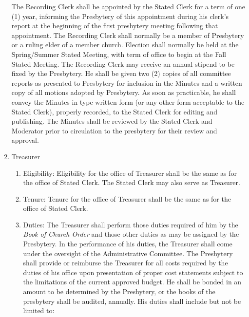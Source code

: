 \documentclass[
]{book}
\providecommand{\tightlist}{%
  \setlength{\itemsep}{0pt}\setlength{\parskip}{0pt}}
\begin{document}
\begin{enumerate}
  The Recording Clerk shall be appointed by the Stated Clerk for a term of one (1) year, informing the Presbytery of this appointment during his clerk's report at the beginning of the first presbytery meeting following that appointment. The Recording Clerk shall normally be a member of Presbytery or a ruling elder of a member church. Election shall normally be held at the Spring/Summer Stated Meeting, with term of office to begin at the Fall Stated Meeting. The Recording Clerk may receive an annual stipend to be fixed by the Presbytery. He shall be given two (2) copies of all committee reports as presented to Presbytery for inclusion in the Minutes and a written copy of all motions adopted by Presbytery. As soon as practicable, he shall convey the Minutes in type-written form (or any other form acceptable to the Stated Clerk), properly recorded, to the Stated Clerk for editing and publishing. The Minutes shall be reviewed by the Stated Clerk and Moderator prior to circulation to the presbytery for their review and approval.
\item
  Treasurer

  \begin{enumerate}
  \def\labelenumii{\arabic{enumii}.}
  \tightlist
  \item
    Eligibility: Eligibility for the office of Treasurer shall be the same as for the office of Stated Clerk. The Stated Clerk may also serve as Treasurer.
  \item
    Tenure: Tenure for the office of Treasurer shall be the same as for the office of Stated Clerk.
  \item
    Duties: The Treasurer shall perform those duties required of him by the \emph{Book of Church Order} and those other duties as may be assigned by the Presbytery. In the performance of his duties, the Treasurer shall come under the oversight of the Administrative Committee. The Presbytery shall provide or reimburse the Treasurer for all costs required by the duties of his office upon presentation of proper cost statements subject to the limitations of the current approved budget. He shall be bonded in an amount to be determined by the Presbytery, or the books of the presbytery shall be audited, annually. His duties shall include but not be limited to:


\end{enumerate}
\end{enumerate}
\end{document}
